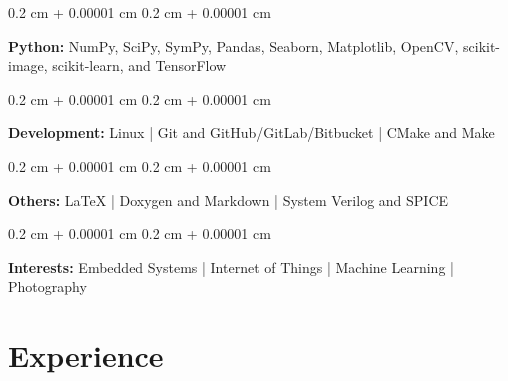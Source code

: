 \documentclass[10pt, letterpaper]{article}
\newenvironment{onecolentry}{
    \begin{adjustwidth}{
        0.2 cm + 0.00001 cm
    }{
        0.2 cm + 0.00001 cm
    }
}{
    \end{adjustwidth}
} %
\begin{document}
        \vspace{0.2 cm}

        \begin{onecolentry}
            \textbf{Python:} NumPy, SciPy, SymPy, Pandas, Seaborn, Matplotlib, OpenCV, scikit-image, scikit-learn, and TensorFlow
        \end{onecolentry}

        \vspace{0.2 cm}

        \begin{onecolentry}
            \textbf{Development:} Linux | Git and GitHub/GitLab/Bitbucket | CMake and Make
        \end{onecolentry}

        \vspace{0.2 cm}

        \begin{onecolentry}
            \textbf{Others:} LaTeX | Doxygen and Markdown | System Verilog and SPICE
        \end{onecolentry}

        \vspace{0.2 cm}

        \begin{onecolentry}
            \textbf{Interests:} Embedded Systems | Internet of Things | Machine Learning | Photography
        \end{onecolentry}


    
    \section{Experience}
\end{document}
